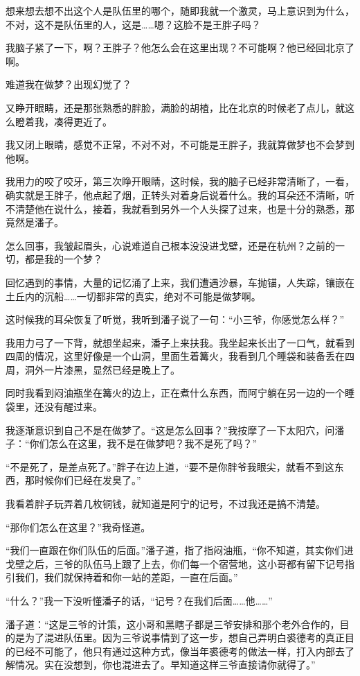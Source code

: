 想来想去想不出这个人是队伍里的哪个，随即我就一个激灵，马上意识到为什么，不对，这不是队伍里的人，这是……嗯？这脸不是王胖子吗？

我脑子紧了一下，啊？王胖子？他怎么会在这里出现？不可能啊？他已经回北京了啊。

难道我在做梦？出现幻觉了？

又睁开眼睛，还是那张熟悉的胖脸，满脸的胡楂，比在北京的时候老了点儿，就这么瞪着我，凑得更近了。

我又闭上眼睛，感觉不正常，不对不对，不可能是王胖子，我就算做梦也不会梦到他啊。

我用力的咬了咬牙，第三次睁开眼睛，这时候，我的脑子已经非常清晰了，一看，确实就是王胖子，他点起了烟，正转头对着身后说着什么。我的耳朵还不清晰，听不清楚他在说什么，接着，我就看到另外一个人头探了过来，也是十分的熟悉，那竟然是潘子。

怎么回事，我皱起眉头，心说难道自己根本没没进戈壁，还是在杭州？之前的一切，都是我的一个梦？

回忆遇到的事情，大量的记忆涌了上来，我们遭遇沙暴，车抛锚，人失踪，镶嵌在土丘内的沉船……一切都非常的真实，绝对不可能是做梦啊。

这时候我的耳朵恢复了听觉，我听到潘子说了一句：“小三爷，你感觉怎么样？”

我用力弓了一下背，就想坐起来，潘子上来扶我。我坐起来长出了一口气，就看到四周的情况，这里好像是一个山洞，里面生着篝火，我看到几个睡袋和装备丢在四周，洞外一片漆黑，显然已经是晚上了。

同时我看到闷油瓶坐在篝火的边上，正在煮什么东西，而阿宁躺在另一边的一个睡袋里，还没有醒过来。

我逐渐意识到自己不是在做梦了。“这是怎么回事？”我按摩了一下太阳穴，问潘子：“你们怎么在这里，我不是在做梦吧？我不是死了吗？”

“不是死了，是差点死了。”胖子在边上道，“要不是你胖爷我眼尖，就看不到这东西，那时候你们已经在发臭了。”

我看着胖子玩弄着几枚铜钱，就知道是阿宁的记号，不过我还是搞不清楚。

“那你们怎么在这里？”我奇怪道。

“我们一直跟在你们队伍的后面。”潘子道，指了指闷油瓶，“你不知道，其实你们进戈壁之后，三爷的队伍马上跟了上去，你们每一个宿营地，这小哥都有留下记号指引我们，我们就保持着和你一站的差距，一直在后面。”

“什么？”我一下没听懂潘子的话，“记号？在我们后面……他……”

潘子道：“这是三爷的计策，这小哥和黑瞎子都是三爷安排和那个老外合作的，目的是为了混进队伍里。因为三爷说事情到了这一步，想自己弄明白裘德考的真正目的已经不可能了，他只有通过这种方式，像当年裘德考的做法一样，打入内部去了解情况。实在没想到，你也混进去了。早知道这样三爷直接请你就得了。”

